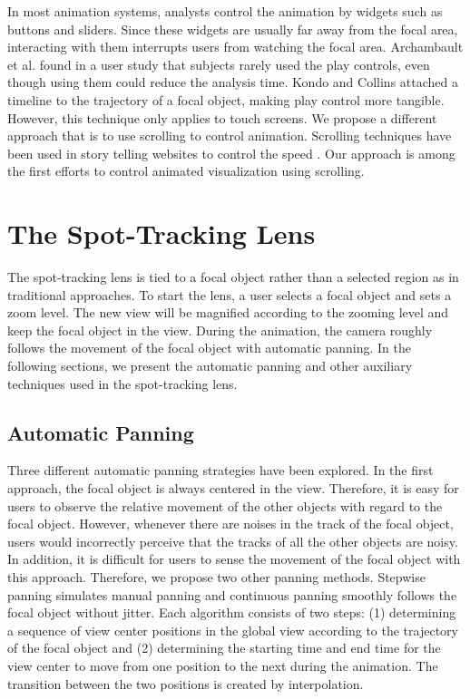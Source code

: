 \documentclass[review]{vgtc}                 %
\begin{document}
In most animation systems, analysts control the animation by widgets such as buttons and sliders. Since these widgets are usually far away from the focal area, interacting with them interrupts users from watching the focal area. Archambault et al. \cite{archambault_animation_2011} found in a user study that subjects rarely used the play controls, even though using them could reduce the analysis time. Kondo and Collins \cite{kondo_dimpvis:_2014} attached a timeline to the trajectory of a focal object, making play control more tangible. However, this technique only applies to touch screens. We propose a different approach that is to use scrolling to control animation. Scrolling techniques have been used in story telling websites to control the speed \cite{frederick2013effects}. Our approach is among the first efforts to control animated visualization using scrolling.

\section{The Spot-Tracking Lens}
\label{sec:lens}
The spot-tracking lens is tied to a focal object rather than a selected region as in traditional approaches. To start the lens, a user selects a focal object and sets a zoom level. The new view will be magnified according to the zooming level and keep the focal object in the view. During the animation, the camera roughly follows the movement of the focal object with automatic panning. In the following sections, we present the automatic panning and other auxiliary techniques used in the spot-tracking lens.

\subsection {Automatic Panning}
Three different automatic panning strategies have been explored. In the first approach, the focal object is always centered in the view. Therefore, it is easy for users to observe the relative movement of the other objects with regard to the focal object. However, whenever there are noises in the track of the focal object, users would incorrectly perceive that the tracks of all the other objects are noisy. In addition, it is difficult for users to sense the movement of the focal object with this approach. Therefore, we propose two other panning methods. Stepwise panning simulates manual panning and continuous panning smoothly follows the focal object without jitter. Each algorithm consists of two steps: (1) determining a sequence of view center positions in the global view according to the trajectory of the focal object and (2) determining the starting time and end time for the view center to move from one position to the next during the animation. The transition between the two positions is created by interpolation.
\end{document}
